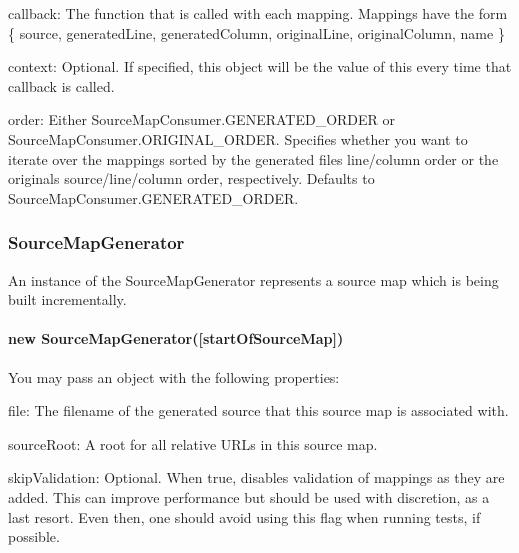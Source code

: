 \begin{DoxyItemize}
\item {\ttfamily callback}\+: The function that is called with each mapping. Mappings have the form {\ttfamily \{ source, generated\+Line, generated\+Column, original\+Line, original\+Column, name \}}
\item {\ttfamily context}\+: Optional. If specified, this object will be the value of {\ttfamily this} every time that {\ttfamily callback} is called.
\item {\ttfamily order}\+: Either {\ttfamily Source\+Map\+Consumer.\+G\+E\+N\+E\+R\+A\+T\+E\+D\+\_\+\+O\+R\+D\+E\+R} or {\ttfamily Source\+Map\+Consumer.\+O\+R\+I\+G\+I\+N\+A\+L\+\_\+\+O\+R\+D\+E\+R}. Specifies whether you want to iterate over the mappings sorted by the generated file\textquotesingle{}s line/column order or the original\textquotesingle{}s source/line/column order, respectively. Defaults to {\ttfamily Source\+Map\+Consumer.\+G\+E\+N\+E\+R\+A\+T\+E\+D\+\_\+\+O\+R\+D\+E\+R}.
\end{DoxyItemize}

\subsubsection*{Source\+Map\+Generator}

An instance of the Source\+Map\+Generator represents a source map which is being built incrementally.

\paragraph*{new Source\+Map\+Generator(\mbox{[}start\+Of\+Source\+Map\mbox{]})}

You may pass an object with the following properties\+:


\begin{DoxyItemize}
\item {\ttfamily file}\+: The filename of the generated source that this source map is associated with.
\item {\ttfamily source\+Root}\+: A root for all relative U\+R\+Ls in this source map.
\item {\ttfamily skip\+Validation}\+: Optional. When {\ttfamily true}, disables validation of mappings as they are added. This can improve performance but should be used with discretion, as a last resort. Even then, one should avoid using this flag when running tests, if possible.
\end{DoxyItemize}

